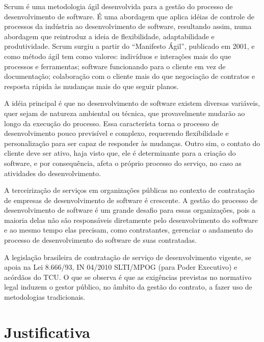 Scrum é uma metodologia ágil desenvolvida para a gestão do processo de desenvolvimento de software. É uma abordagem que aplica idéias de controle de processos da indústria ao desenvolvimento de software, resultando assim, numa abordagem que reintroduz a ideia de flexibilidade, adaptabilidade e produtividade. Scrum surgiu a partir do “Manifesto Ágil”, publicado em 2001, e como método ágil tem como valores: indivíduos e interações mais do que processos e ferramentas; software funcionando para o cliente em vez de documentação; colaboração com o cliente mais do que negociação de contratos e resposta rápida às mudanças mais do que seguir planos. 
\textcolor{red}{}

A idéia principal é que no desenvolvimento de software existem diversas variáveis, quer sejam de natureza ambiental ou técnica, que provavelmente mudarão ao longo da execução do processo. Essa característa torna o processo de desenvolvimento pouco previsível e complexo, requerendo flexibilidade e personalização para ser capaz de responder às mudanças. Outro sim, o contato do cliente deve ser ativo, haja visto que, ele é determinante para a criação do software, e por consequência, afeta o próprio processo do serviço, no caso as atividades do desenvolvimento.

A terceirização de serviços em organizações públicas no contexto de contratação de empresas de desenvolvimento de software é crescente. A gestão do processo de desenvolvimento de software é um grande desafio para essas organizações, pois a maioria delas não são responsáveis diretamente pelo desenvolvimento do software e ao mesmo tempo elas precisam, como contratantes, gerenciar o andamento do processo de desenvolvimento do software de suas contratadas. 

A legislação brasileira de contratação de serviço de desenvolvimento vigente, se apoia na Lei 8.666/93, IN 04/2010 SLTI/MPOG (para Poder Executivo) e acórdãos do TCU. O que se observa é que as exigências previstas no normativo legal induzem o gestor público, no âmbito da gestão do contrato, a fazer uso de metodologias tradicionais.
\textcolor{red}{}



\section[Justificativa]{Justificativa}

